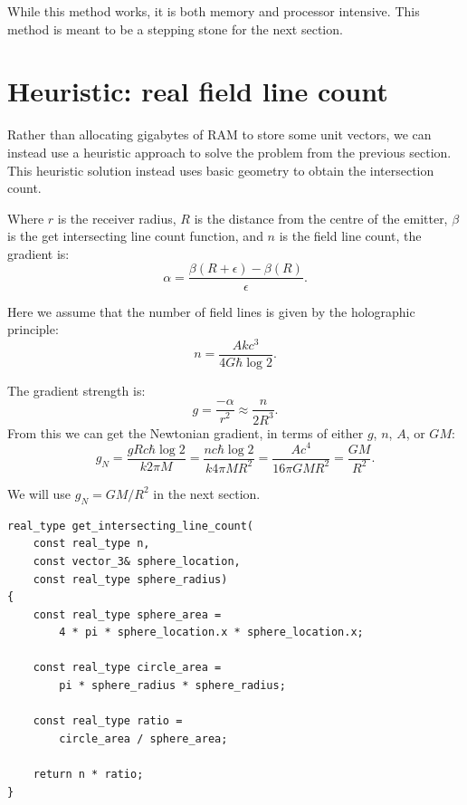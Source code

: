 \documentclass[12pt]{article}
\begin{document}
While this method works, it is both memory and processor intensive.
This method is meant to be a stepping stone for the next section.







\section{Heuristic: real field line count}

Rather than allocating gigabytes of RAM to store some unit vectors, we can instead use a heuristic approach to solve the problem from the previous section.
This heuristic solution instead uses basic geometry to obtain the intersection count.

Where $r$ is the receiver radius, $R$ is the distance from the centre of the emitter, $\beta$ is the get intersecting line count function, and $n$ is the field line count, the gradient is:
\begin{equation}
\alpha = \frac{\beta(R + \epsilon) - \beta(R)}{\epsilon}.
\end{equation}

Here we assume that the number of field lines is given by the holographic principle:
\begin{equation}
n = \frac{A k c^3}{ 4 G \hbar \log 2}.
\end{equation}

The gradient strength is:
\begin{equation}
g = \frac{-\alpha}{r^2} \approx \frac{n}{2 R^3}.
\end{equation}
From this we can get the Newtonian gradient, in terms of either $g$, $n$, $A$, or $G M$:
\begin{equation}
\label{g_N_equation}
g_N = \frac{g R c \hbar \log 2}{k 2 \pi M} = \frac{n c \hbar \log 2}{k 4 \pi M R^2} = \frac{A c^4}{16 \pi G M R^2} = \frac{G M}{R^2}.
\end{equation}

We will use $g_N = {G M}/{R^2}$ in the next section.

\begin{lstlisting}
real_type get_intersecting_line_count(
	const real_type n,
	const vector_3& sphere_location,
	const real_type sphere_radius)
{
	const real_type sphere_area = 
		4 * pi * sphere_location.x * sphere_location.x;

	const real_type circle_area = 
		pi * sphere_radius * sphere_radius;
	
	const real_type ratio = 
		circle_area / sphere_area;
	
	return n * ratio;
}
\end{lstlisting}
\end{document}
